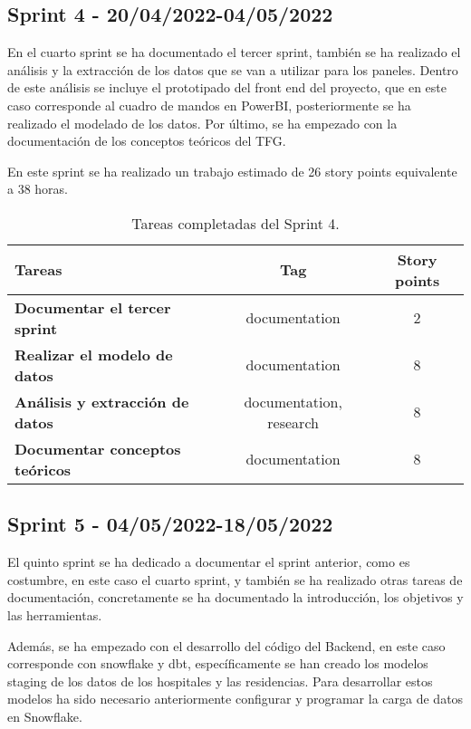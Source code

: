 \subsection{Sprint 4 - 20/04/2022-04/05/2022}
En el cuarto sprint se ha documentado el tercer sprint, también se ha realizado el análisis y la extracción de los datos que se van a utilizar para los paneles. Dentro de este análisis se incluye el prototipado del front end del proyecto, que en este caso corresponde al cuadro de mandos en PowerBI, posteriormente se ha realizado el modelado de los datos. Por último, se ha empezado con la documentación de los conceptos teóricos del TFG.


En este sprint se ha realizado un trabajo estimado de 26 story points equivalente a 38 horas.

\begin{table}[ht!]
    \centering
    \resizebox{15cm}{!} {
    \begin{tabular}{|l|c|c|}
    \hline
    \textbf{Tareas}     &\textbf{Tag}     & \textbf{Story points} \\ \hline
    \textbf{Documentar el tercer sprint}         &documentation      &2 \\ \hline 
    \textbf{Realizar el modelo de datos}         &documentation      &8 \\ \hline
    \textbf{Análisis y extracción de datos}         &documentation, research      &8 \\ \hline 
    \textbf{Documentar conceptos teóricos}         &documentation      &8 \\ \hline 
    \end{tabular}}
    \caption{Tareas completadas del Sprint 4.}
    \label{tab:my_label}
\end{table}
\subsection{Sprint 5 - 04/05/2022-18/05/2022}
El quinto sprint se ha dedicado a documentar el sprint anterior, como es costumbre, en este caso el cuarto sprint, y también se ha realizado otras tareas de documentación, concretamente se ha documentado la introducción, los objetivos y las herramientas.

Además, se ha empezado con el desarrollo del código del Backend, en este caso corresponde con snowflake y dbt, específicamente se han creado los modelos staging de los datos de los hospitales y las residencias. Para desarrollar estos modelos ha sido necesario anteriormente configurar y programar la carga de datos en Snowflake.

